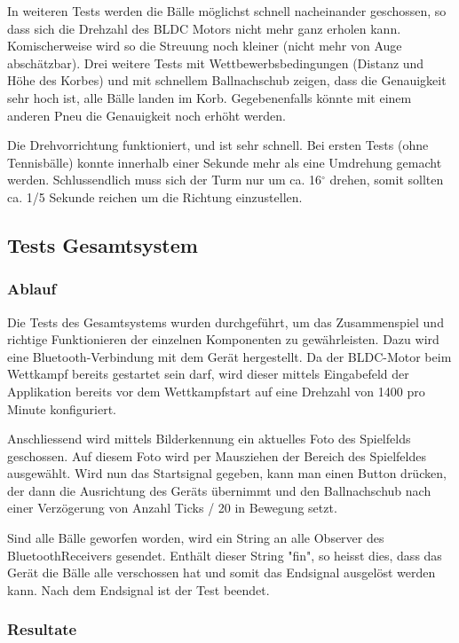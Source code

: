 In weiteren Tests werden die Bälle möglichst schnell nacheinander geschossen, so dass sich die Drehzahl des BLDC Motors nicht mehr ganz erholen kann. Komischerweise wird so die Streuung noch kleiner (nicht mehr von Auge abschätzbar). Drei weitere Tests mit Wettbewerbsbedingungen (Distanz und Höhe des Korbes) und mit schnellem Ballnachschub zeigen, dass die Genauigkeit sehr hoch ist, alle Bälle landen im Korb. Gegebenenfalls könnte mit einem anderen Pneu die Genauigkeit noch erhöht werden.

Die Drehvorrichtung funktioniert, und ist sehr schnell. Bei ersten Tests (ohne Tennisbälle) konnte innerhalb einer Sekunde mehr als eine Umdrehung gemacht werden. Schlussendlich muss sich der Turm nur um ca. 16$^\circ$ drehen, somit sollten ca. 1/5 Sekunde reichen um die Richtung einzustellen.



\subsection{Tests Gesamtsystem}
\subsubsection{Ablauf}
Die Tests des Gesamtsystems wurden durchgeführt, um das Zusammenspiel und richtige Funktionieren der einzelnen Komponenten zu gewährleisten. Dazu wird eine Bluetooth-Verbindung mit dem Gerät hergestellt. Da der BLDC-Motor beim Wettkampf bereits gestartet sein darf, wird dieser mittels Eingabefeld der Applikation bereits vor dem Wettkampfstart auf eine Drehzahl von 1400 pro Minute konfiguriert.

Anschliessend wird mittels Bilderkennung ein aktuelles Foto des Spielfelds geschossen. Auf diesem Foto wird per Mausziehen der Bereich des Spielfeldes ausgewählt. Wird nun das Startsignal gegeben, kann man einen Button drücken, der dann die Ausrichtung des Geräts übernimmt und den Ballnachschub nach einer Verzögerung von Anzahl Ticks / 20 in Bewegung setzt.

Sind alle Bälle geworfen worden, wird ein String an alle Observer des BluetoothReceivers gesendet. Enthält dieser String "fin", so heisst dies, dass das Gerät die Bälle alle verschossen hat und somit das Endsignal ausgelöst werden kann. Nach dem Endsignal ist der Test beendet.

\subsubsection{Resultate}

